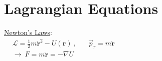 \documentclass[12pt]{article}
\begin{document}
\newpage
\section{Lagrangian Equations}

\noindent
{}
\hspace{3cm}
\begin{minipage}[t]{8cm}
    \underline{Newton's Laws}:\\[15pt]
    \(\begin{aligned}
        &\mathcal{L} = \tfrac{1}{2} m \dot{ \mathbf{r} }^2 - U( \mathbf{r} ) \ ,
            \hspace{20pt} \vec{p}_r = m \dot{ \mathbf{r} }\\[10pt]
        &\rightarrow \ \boxed{ F = m \ddot{ \mathbf{r} } = - \nabla U }
    \end{aligned}\)    
\end{minipage}
\end{document}
